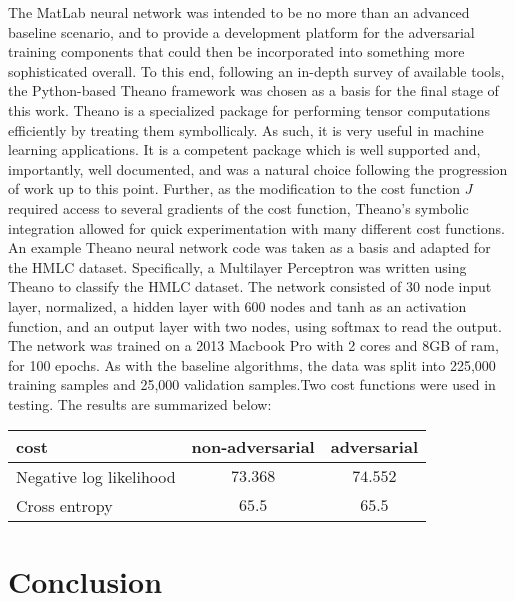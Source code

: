 \documentclass{article} %
\begin{document}
The MatLab neural network was intended to be no more than an advanced baseline scenario, and to provide a development platform for the adversarial training components that could then be incorporated into something more sophisticated overall. To this end, following an in-depth survey of available tools, the Python-based Theano framework was chosen as a basis for the final stage of this work. Theano is a specialized package for performing tensor computations efficiently by treating them symbollicaly. As such, it is very useful in machine learning applications. It is a competent package which is well supported and, importantly, well documented, and was a natural choice following the progression of work up to this point. Further, as the modification to the cost function $J$ required access to several gradients of the cost function, Theano's symbolic integration allowed for quick experimentation with many different cost functions. An example Theano neural network code was taken as a basis and adapted for the HMLC dataset. Specifically, a Multilayer Perceptron was written using Theano to classify the HMLC dataset. The network consisted of 30 node input layer, normalized, a hidden layer with 600 nodes and tanh as an activation function, and an output layer with two nodes, using softmax to read the output. The network was trained on a 2013 Macbook Pro with 2 cores and 8GB of ram, for 100 epochs. As with the baseline algorithms, the data was split into 225,000 training samples and 25,000 validation samples.Two cost functions were used in testing. The results are summarized below:
\begin{center}
	\begin{tabular}{|l|c|c|}
	  \hline
	  cost&non-adversarial&adversarial \\
	  \hline
	  Negative log likelihood&$73.368$&$74.552$\\
	  \hline
	  Cross entropy&$65.5$&$65.5$ \\
	  \hline
	\end{tabular}
\end{center}
	



\section{Conclusion}
\label{sec:conclusion}
\end{document}
